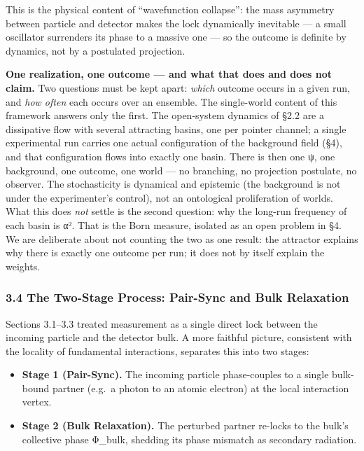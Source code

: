 \documentclass[
]{article}
\providecommand{\tightlist}{%
  \setlength{\itemsep}{0pt}\setlength{\parskip}{0pt}}
\begin{document}
This is the physical content of ``wavefunction collapse'': the mass
asymmetry between particle and detector makes the lock dynamically
inevitable --- a small oscillator surrenders its phase to a massive one
--- so the outcome is definite by dynamics, not by a postulated
projection.

\textbf{One realization, one outcome --- and what that does and does not
claim.} Two questions must be kept apart: \emph{which} outcome occurs in
a given run, and \emph{how often} each occurs over an ensemble. The
single-world content of this framework answers only the first. The
open-system dynamics of §2.2 are a dissipative flow with several
attracting basins, one per pointer channel; a single experimental run
carries one actual configuration of the background field (§4), and that
configuration flows into exactly one basin. There is then one ψ, one
background, one outcome, one world --- no branching, no projection
postulate, no observer. The stochasticity is dynamical and epistemic
(the background is not under the experimenter's control), not an
ontological proliferation of worlds. What this does \emph{not} settle is
the second question: why the long-run frequency of each basin is
\textbar α\textbar². That is the Born measure, isolated as an open
problem in §4. We are deliberate about not counting the two as one
result: the attractor explains why there is exactly one outcome per run;
it does not by itself explain the weights.

\subsubsection{3.4 The Two-Stage Process: Pair-Sync and Bulk
Relaxation}\label{the-two-stage-process-pair-sync-and-bulk-relaxation}

Sections 3.1--3.3 treated measurement as a single direct lock between
the incoming particle and the detector bulk. A more faithful picture,
consistent with the locality of fundamental interactions, separates this
into two stages:

\begin{itemize}
\tightlist
\item
  \textbf{Stage 1 (Pair-Sync).} The incoming particle phase-couples to a
  single bulk-bound partner (e.g.~a photon to an atomic electron) at the
  local interaction vertex.
\item
  \textbf{Stage 2 (Bulk Relaxation).} The perturbed partner re-locks to
  the bulk's collective phase Φ\_bulk, shedding its phase mismatch as
  secondary radiation.
\end{itemize}
\end{document}
